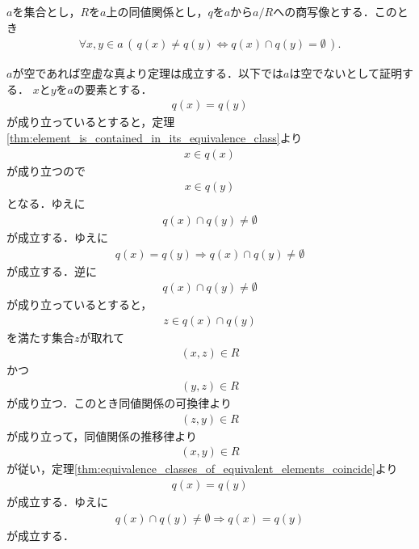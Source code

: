 	\begin{screen}
		\begin{thm}[同値類は一致していなければ交わらない]
			$a$を集合とし，$R$を$a$上の同値関係とし，$q$を$a$から$a/R$への商写像とする．このとき
			\begin{align}
				\forall x,y \in a\, \left(\, q(x) \neq q(y) \Longleftrightarrow q(x) \cap q(y) = \emptyset\, \right).
			\end{align}
		\end{thm}
	\end{screen}
	
	\begin{sketch}
		$a$が空であれば空虚な真より定理は成立する．以下では$a$は空でないとして証明する．
		$x$と$y$を$a$の要素とする．
		\begin{align}
			q(x) = q(y)
		\end{align}
		が成り立っているとすると，定理\ref{thm:element_is_contained_in_its_equivalence_class}より
		\begin{align}
			x \in q(x)
		\end{align}
		が成り立つので
		\begin{align}
			x \in q(y)
		\end{align}
		となる．ゆえに
		\begin{align}
			q(x) \cap q(y) \neq \emptyset
		\end{align}
		が成立する．ゆえに
		\begin{align}
			q(x) = q(y) \Longrightarrow q(x) \cap q(y) \neq \emptyset
		\end{align}
		が成立する．逆に
		\begin{align}
			q(x) \cap q(y) \neq \emptyset
		\end{align}
		が成り立っているとすると，
		\begin{align}
			z \in q(x) \cap q(y)
		\end{align}
		を満たす集合$z$が取れて
		\begin{align}
			(x,z) \in R
		\end{align}
		かつ
		\begin{align}
			(y,z) \in R
		\end{align}
		が成り立つ．このとき同値関係の可換律より
		\begin{align}
			(z,y) \in R
		\end{align}
		が成り立って，同値関係の推移律より
		\begin{align}
			(x,y) \in R
		\end{align}
		が従い，定理\ref{thm:equivalence_classes_of_equivalent_elements_coincide}より
		\begin{align}
			q(x) = q(y)
		\end{align}
		が成立する．ゆえに
		\begin{align}
			q(x) \cap q(y) \neq \emptyset \Longrightarrow q(x) = q(y)
		\end{align}
		が成立する．
		\QED
	\end{sketch}